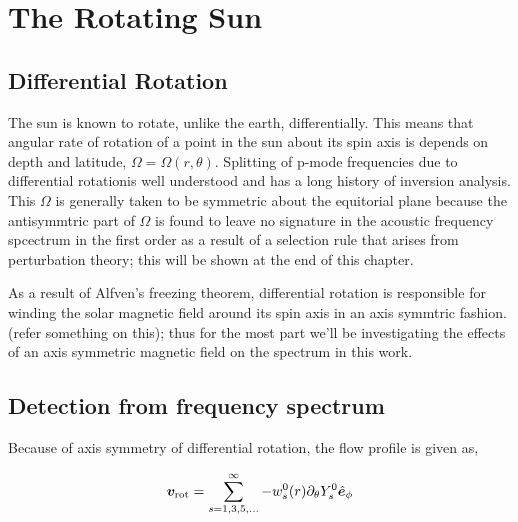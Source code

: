 
\chapter{The Rotating Sun}

\section{Differential Rotation}
The sun is known to rotate, unlike the earth, differentially. This means that angular rate of rotation of a point in the sun about its spin axis is depends on depth and latitude, $\Omega = \Omega(r,\theta)$. Splitting of p-mode frequencies due to differential rotationis well understood\cite{ritzwoller} and has a long history of inversion analysis\cite{schou98}.
This $\Omega$ is generally taken to be symmetric about the equitorial plane because the antisymmtric part of $\Omega$ is found to leave no signature in the acoustic frequency spcectrum in the first order as a result of a selection rule that arises from perturbation theory; this will be shown at the end of this chapter.

As a result of Alfven's freezing theorem, differential rotation is responsible for winding the solar magnetic field around its spin axis in an axis symmtric fashion. (refer something on this); thus for the most part we'll be investigating the effects of an axis symmetric magnetic field on the spectrum in this work.

\section{Detection from frequency spectrum}

Because of axis symmetry of differential rotation, the flow profile is given as,

\begin{equation}
\bm{v}_{\text{rot}} = \sum_{s = 1,3,5,...}^{\infty} -w_s^0(r) \partial_{\theta} Y_s^0 \hat{\bm{e}}_{\phi}
\end{equation}

